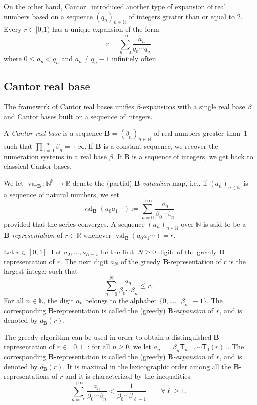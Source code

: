 \documentclass[12pt,reqno]{amsart}
\newcommand\emilie[1]{\mbox{}
{\marginpar{\color{orange}E}}
{\sf\noindent\color{orange}[#1]}}
\newcommand{\B}{{\mathbf{B}}}
\DeclareMathOperator{\val}{val}
\begin{document}
On the other hand, Cantor~\cite{cantor} introduced another type of expansion of real numbers based on a sequence $(q_n)_{n\in \mathbb{N}}$ of integers greater than or equal to $2$. Every $r\in[0,1)$ has a unique expansion of the form 
\[ 
    r=\sum_{n=0}^{+\infty} \frac{a_n}{q_0\cdots q_n}
\]
where $0\le a_n<q_n$ and $a_n\neq q_n-1$ infinitely often. 

\subsection{Cantor real base}
The framework of Cantor real bases unifies $\beta$-expansions with a single real base $\beta$ and Cantor bases built on a sequence of integers. 

\begin{definition}
    A \emph{Cantor real base} is a sequence $\B=(\beta_n)_{n\in\mathbb{N}}$ of real numbers greater than~$1$  such that $\prod_{n=0}^{+\infty}\beta_n=+\infty$. If $\B$ is a constant sequence, we recover the numeration systems in a real base $\beta$. If $\B$ is a sequence of integers, we get back to classical Cantor bases.
\end{definition}
We let $\val_{\B}\colon \mathbb{N}^\mathbb{N}\to\mathbb{R}$ denote the (partial) {\em $\B$-valuation} map, i.e., if $(a_n)_{n\in\mathbb{N}}$ is a sequence of natural numbers, we set 
\[
    \val_{\B}(a_0a_1\cdots):=\sum_{n=0}^{+\infty}\frac{a_n}{\beta_0\cdots \beta_n}
\]
provided that the series converges. A sequence $(a_n)_{n\in\mathbb{N}}$ over $\mathbb{N}$ is said to be a {\em $\B$-representation} of $r\in\mathbb{R}$ whenever $\val_{\B}(a_0a_1\cdots)=r$. 

\begin{definition}
Let $r\in [0,1]$. Let $a_0,\ldots,a_{N-1}$ be the first~$N\ge 0$ digits of the greedy $\B$-representation of $r$. The next digit $a_N$ of the greedy $\B$-representation of $r$ is the largest integer such that 
\[ 
    \sum_{n=0}^N	\frac{a_n}{\beta_0\cdots \beta_n}\le r.
\] 
For all $n\in \mathbb{N}$, the digit $a_n$ belongs to the alphabet $\{0,\ldots,\lceil{\beta_n}\rceil-1\}$. The corresponding $\B$-representation is called the (greedy) {\em $\B$-expansion} of~$r$, and is denoted by $d_{\B}(r)$.     

The greedy algorithm can be used in order to obtain a distinguished $\B$-representation of $r\in[0,1]$: for all $n\ge 0$, we let $a_n=\lfloor \beta_n \mathsf{T}_{n-1}\cdots \mathsf{T}_0(r)\rfloor$. The corresponding $\B$-representation is called the (greedy) {\em $\B$-expansion} of~$r$, and is denoted by $d_{\B}(r)$.  It is maximal in the lexicographic order among all the $\B$-representations of $r$ and it is characterized by the inequalities
\begin{equation}
    \label{eq:greedy-inequalities-Cantor}
    \sum_{n= \ell}^{+\infty} \frac{a_n}{\beta_0\cdots \beta_n}<\frac{1}{\beta_0\cdots \beta_{\ell-1}} \qquad \forall\ell\ge 1.
\end{equation}
\end{definition}
\end{document}
